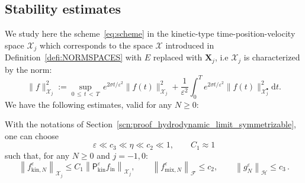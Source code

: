 \documentclass[AHL,Unicode,longabstracts,published]{cedram}
\newcommand{\ini}{\mathrm{in}}
\newcommand{\mix}{\mathrm{mix}}
\newcommand{\kin}{\mathrm{kin}}
\renewcommand{\d}{\mathrm{d}}
\newcommand{\XX}{\mathcal{X}}
\newcommand{\PP}{\mathsf{P}}
\newcommand{\FFF}{\mathscr{F}}
\newcommand{\HHH}{\mathscr{H}}
\newcommand{\GGG}{\mathscr{X}}
\newcommand{\SSSs}{\HHH}
\newcommand{\SSSl}{\GGG}
\newcommand{\Sh}{\bm{X}}
\newcommand{\SSh}{\bm{\XX}}
\newcommand{\SShp}{\bm{\XX}^{\bullet}}
\newcommand{\SSSh}{\pmb{\GGG}}
\newcommand{\SSSm}{\FFF}
\renewcommand*\le{\leqslant}
\renewcommand*\ge{\geqslant}
\renewcommand*\geq{\geqslant}
\newcommand*\eps{{\varepsilon}}
\begin{document}
\subsection{Stability estimates}

We study here the scheme~\eqref{eq:scheme} in the kinetic-type time-position-velocity space $\SSSh_j$ which corresponds to the space $\SSSl$ introduced in Definition~\ref{defi:NORMSPACES} with $E$ replaced with $\Sh_{j}$, i.e $\SSSh_j$ is characterized by the norm:
\begin{equation}\label{eq:defiTildeSSSl}
\| f \|_{ \SSSh_j}^2 := \sup_{0\,\le\,t\,<\,T} \, e^{2 \sigma t / \eps^2 } \| f(t) \|_{\SSh_j}^2 + \frac{1}{\eps^2} \int_0^T e^{2 \sigma t / \eps^2} \| f(t) \|_{\SShp_{j}}^2 \d t.
\end{equation}
We have the following estimates, valid for any $N\geq0$:

\begin{lemm}\label{lem:stable-scheme}
With the notations of Section~\ref{scn:proof_hydrodynamic_limit_symmetrizable}, one can choose
\[
\eps \ll c_3 \ll \eta \ll c_2 \ll 1, \qquad C_1 \approx 1
\]
such that, for any $N \ge 0$ and $j = -1, 0$:
\begin{equation}\label{eq:inductive_stability}
\left\| f^\eps_{\kin, N}\right\|_{\SSSh_j} \le C_1 \left\| \PP^\eps_\kin f_\ini \right\|_{ \SSh_j}, \qquad \left\| f^\eps_{\mix,N} \right\|_{\SSSm} \le c_2, \qquad \left\| g^\eps_N \right\|_{\SSSs} \le c_3\,.
\end{equation}
\end{lemm}
\end{document}
